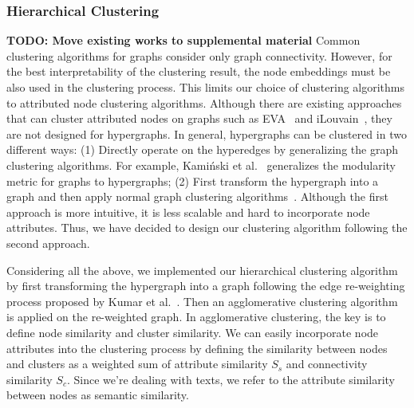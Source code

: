 \subsubsection{Hierarchical Clustering}\label{sec: clustering}
\textbf{TODO: Move existing works to supplemental material}
Common clustering algorithms for graphs consider only graph connectivity.
However, for the best interpretability of the clustering result, the node embeddings must be also used in the clustering process.
This limits our choice of clustering algorithms to attributed node clustering algorithms.
Although there are existing approaches that can cluster attributed nodes on graphs such as EVA~\cite{citraro2020eva} and iLouvain~\cite{combe2015louvain}, they are not designed for hypergraphs.
In general, hypergraphs can be clustered in two different ways: 
(1) Directly operate on the hyperedges by generalizing the graph clustering algorithms.
For example, Kamiński et al.~\cite{kaminski2021hgraphcommunity} generalizes the modularity metric for graphs to hypergraphs; 
(2) First transform the hypergraph into a graph and then apply normal graph clustering algorithms~\cite{kumar2020new}.
Although the first approach is more intuitive, it is less scalable and hard to incorporate node attributes.
Thus, we have decided to design our clustering algorithm following the second approach.

Considering all the above, we implemented our hierarchical clustering algorithm by first transforming the hypergraph into a graph following the edge re-weighting process proposed by Kumar et al.~\cite{kumar2020new}.
Then an agglomerative clustering algorithm~\cite{steinbach2000doccluster} is applied on the re-weighted graph.
In agglomerative clustering, the key is to define node similarity and cluster similarity.
We can easily incorporate node attributes into the clustering process by defining the similarity between nodes and clusters as a weighted sum of attribute similarity $S_s$ and connectivity similarity $S_c$.
Since we're dealing with texts, we refer to the attribute similarity between nodes as semantic similarity. 

